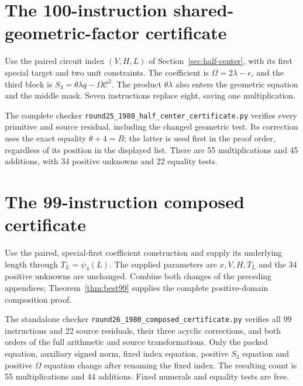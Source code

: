 \documentclass[11pt,letterpaper]{article}
\theoremstyle{definition}
\theoremstyle{remark}
\numberwithin{equation}{section}
\newcommand{\file}[1]{\texttt{#1}}
\begin{document}
\small


\clearpage\normalsize
\section{The 100-instruction shared-geometric-factor certificate}\label{app:100-encoding}

Use the paired circuit index $(V,H,L)$ of Section~\ref{sec:half-center},
with its first special target and two unit constraints. The coefficient
is $\Omega=2\lambda-e$, and the third block is
$S_3=\theta\lambda q-\Omega\mathcal C^2$. The product
$\theta\lambda$ also enters the geometric equation and the middle mask.
Seven instructions replace eight, saving one multiplication.

The complete checker \file{round25\_1980\_half\_center\_certificate.py}
verifies every primitive and source residual, including the changed
geometric test. Its correction uses the exact equality $\theta+4=B$;
the latter is used first in the proof order, regardless of its position
in the displayed list. There are 55 multiplications and 45 additions,
with 34 positive unknowns and 22 equality tests.

\small


\clearpage\normalsize
\section{The 99-instruction composed certificate}\label{app:99}

Use the paired, special-first coefficient construction and supply its
underlying length through $T_L=\psi_4(L)$. The supplied parameters are
$x,V,H,T_L$ and the 34 positive unknowns are unchanged. Combine both
changes of the preceding appendices; Theorem~\ref{thm:best99} supplies
the complete positive-domain composition proof.

The standalone checker \file{round26\_1980\_composed\_certificate.py}
verifies all 99 instructions and 22 source residuals, their three
acyclic corrections, and both orders of the full arithmetic and source
transformations. Only the packed equation, auxiliary signed norm,
fixed index equation, positive $S_3$ equation and positive $\Omega$
equation change after renaming the fixed index. The resulting count is
55 multiplications and 44 additions. Fixed numerals and equality tests
are free.

\small

\end{document}
